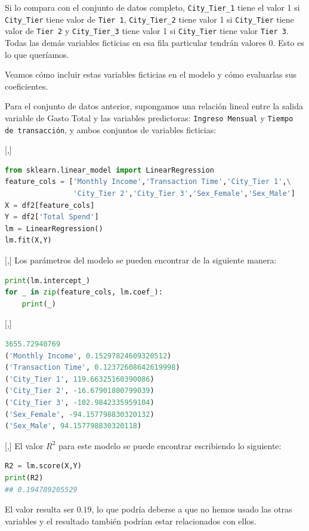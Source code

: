 Si lo compara con el conjunto de datos completo, \texttt{City\_Tier\_1} tiene el valor 1 si \texttt{City\_Tier}
tiene valor de \texttt{Tier 1}, \texttt{City\_Tier\_2} tiene valor 1 si \texttt{City\_Tier} tiene valor de \texttt{Tier 2} y
\texttt{City\_Tier\_3} tiene valor 1 si \texttt{City\_Tier} tiene valor \texttt{Tier 3}. Todas las demás variables ficticias en esa fila particular tendrán valores 0. Esto es lo que queríamos.


Veamos cómo incluir estas variables ficticias en el modelo y cómo evaluarlas
sus coeficientes.

Para el conjunto de datos anterior, supongamos una relación lineal entre la salida
variable de Gasto Total y las variables predictoras: \texttt{Ingreso Mensual} y
\texttt{Tiempo de transacción}, y ambos conjuntos de variables ficticias:

[,]{}
\tiny
\begin{lstlisting}[language=Python]
from sklearn.linear_model import LinearRegression
feature_cols = ['Monthly Income','Transaction Time','City_Tier 1',\
                'City_Tier 2','City_Tier 3','Sex_Female','Sex_Male']
X = df2[feature_cols]
Y = df2['Total Spend']
lm = LinearRegression()
lm.fit(X,Y)
\end{lstlisting}

[,]{}
Los parámetros del modelo se pueden encontrar de la siguiente manera:
\begin{lstlisting}[language=Python]
print(lm.intercept_)
for _ in zip(feature_cols, lm.coef_):
    print(_)
\end{lstlisting}

[,]{}
\begin{lstlisting}[language=Python]
3655.72940769
('Monthly Income', 0.15297824609320512)
('Transaction Time', 0.12372608642619998)
('City_Tier 1', 119.66325160390086)
('City_Tier 2', -16.67901800799039)
('City_Tier 3', -102.9842335959104)
('Sex_Female', -94.157798830320132)
('Sex_Male', 94.157798830320118)
\end{lstlisting}

[,]{}
El valor $R^2$ para este modelo se puede encontrar escribiendo lo siguiente:
\begin{lstlisting}[language=Python]
R2 = lm.score(X,Y)
print(R2)
## 0.194789205529
\end{lstlisting}


El valor resulta ser $0.19$, lo que podría deberse a que no hemos usado las otras variables y el resultado también podrían estar relacionados con ellos. 

